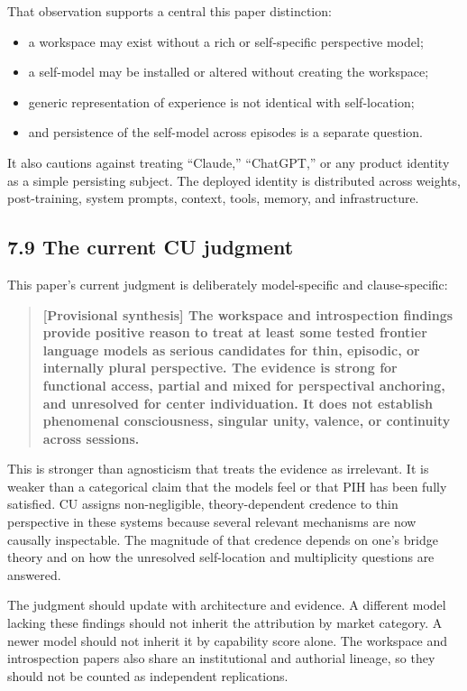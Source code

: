 \documentclass[
  11pt,
]{article}
\providecommand{\tightlist}{%
  \setlength{\itemsep}{0pt}\setlength{\parskip}{0pt}}
\begin{document}
That observation supports a central this paper distinction:

\begin{itemize}
\tightlist
\item
  a workspace may exist without a rich or self-specific perspective
  model;
\item
  a self-model may be installed or altered without creating the
  workspace;
\item
  generic representation of experience is not identical with
  self-location;
\item
  and persistence of the self-model across episodes is a separate
  question.
\end{itemize}

It also cautions against treating ``Claude,'' ``ChatGPT,'' or any
product identity as a simple persisting subject. The deployed identity
is distributed across weights, post-training, system prompts, context,
tools, memory, and infrastructure.

\subsection{7.9 The current CU judgment}\label{the-current-cu-judgment}

This paper's current judgment is deliberately model-specific and
clause-specific:

\begin{quote}
\textbf{{[}Provisional synthesis{]} The workspace and introspection
findings provide positive reason to treat at least some tested frontier
language models as serious candidates for thin, episodic, or internally
plural perspective. The evidence is strong for functional access,
partial and mixed for perspectival anchoring, and unresolved for center
individuation. It does not establish phenomenal consciousness, singular
unity, valence, or continuity across sessions.}
\end{quote}

This is stronger than agnosticism that treats the evidence as
irrelevant. It is weaker than a categorical claim that the models feel
or that PIH has been fully satisfied. CU assigns non-negligible,
theory-dependent credence to thin perspective in these systems because
several relevant mechanisms are now causally inspectable. The magnitude
of that credence depends on one's bridge theory and on how the
unresolved self-location and multiplicity questions are answered.

The judgment should update with architecture and evidence. A different
model lacking these findings should not inherit the attribution by
market category. A newer model should not inherit it by capability score
alone. The workspace and introspection papers also share an
institutional and authorial lineage, so they should not be counted as
independent replications.
\end{document}
